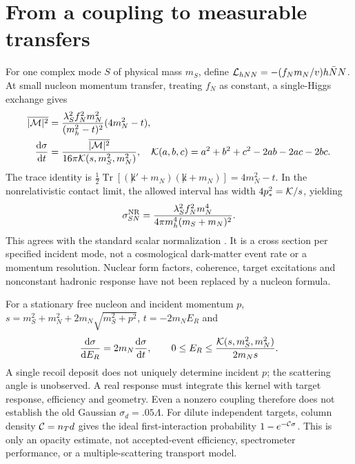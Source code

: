 \documentclass[11pt,a4paper]{article}
\newcommand{\dd}{\mathrm d}
\begin{document}
\section{From a coupling to measurable transfers}
For one complex mode $S$ of physical mass $m_S$, define
${\cal L}_{hNN}=-(f_Nm_N/v)h\bar NN$. At small nucleon momentum
transfer, treating $f_N$ as constant, a single-Higgs exchange gives
\begin{align}
 \overline{|{\cal M}|^2}
 &=\frac{\lambda_S^2 f_N^2m_N^2}{(m_h^2-t)^2}(4m_N^2-t),\\
 \frac{\dd\sigma}{\dd t}
 &=\frac{\overline{|{\cal M}|^2}}{16\pi{\cal K}(s,m_S^2,m_N^2)},
 \quad {\cal K}(a,b,c)=a^2+b^2+c^2-2ab-2ac-2bc .
\end{align}
The trace identity is
$\tfrac12\operatorname{Tr}[(\not k'+m_N)(\not k+m_N)]
=4m_N^2-t$. In the nonrelativistic contact limit, the allowed interval
has width $4p_*^2={\cal K}/s$, yielding
\begin{equation}\label{eq:sigma}
 \sigma_{SN}^{\rm NR}=
 \frac{\lambda_S^2 f_N^2m_N^4}{4\pi m_h^4(m_S+m_N)^2}.
\end{equation}
This agrees with the standard scalar normalization \cite{cline}.
It is a cross section per specified incident mode, not a cosmological
dark-matter event rate or a momentum resolution. Nuclear form factors,
coherence, target excitations and nonconstant hadronic response have
not been replaced by a nucleon formula.

For a stationary free nucleon and incident momentum $p$,
$s=m_S^2+m_N^2+2m_N\sqrt{m_S^2+p^2}$,
$t=-2m_NE_R$ and
\begin{equation}
 \frac{\dd\sigma}{\dd E_R}=2m_N\frac{\dd\sigma}{\dd t},\qquad
 0\leq E_R\leq\frac{{\cal K}(s,m_S^2,m_N^2)}{2m_Ns}.
\end{equation}
A single recoil deposit does not uniquely determine incident $p$;
the scattering angle is unobserved. A real response must integrate this
kernel with target response, efficiency and geometry. Even a nonzero
coupling therefore does not establish the old Gaussian $\sigma_d=.05\Lambda$.
For dilute independent targets, column density ${\cal C}=n_Td$ gives
the ideal first-interaction probability $1-e^{-{\cal C}\sigma}$.
This is only an opacity estimate, not accepted-event efficiency,
spectrometer performance, or a multiple-scattering transport model.
\end{document}
